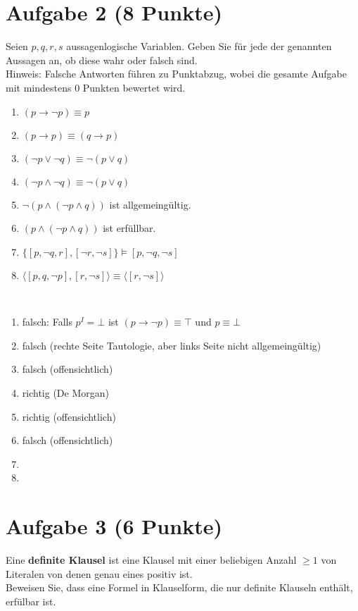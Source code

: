 \documentclass[12pt,a4paper]{article}
\begin{document}
\section*{Aufgabe 2 (8 Punkte)}
Seien $p,q,r,s$ aussagenlogische Variablen. Geben Sie für jede der genannten Aussagen an, ob diese wahr oder falsch sind.\\

Hinweis: Falsche Antworten führen zu Punktabzug, wobei die gesamte Aufgabe mit mindestens 0 Punkten bewertet wird.

\begin{enumerate}[label=\alph*)]
\item $(p\to\neg p)\equiv p$
\item $(p\to p)\equiv(q\to p)$
\item $(\neg p\vee\neg q)\equiv \neg(p\vee q)$
\item $(\neg p\wedge\neg q)\equiv \neg(p\vee q)$
\item $\neg(p\wedge(\neg p\wedge q))$ ist allgemeingültig.
\item $(p\wedge(\neg p\wedge q))$ ist erfüllbar.
\item $\big\lbrace[p,\neg q,r],[\neg r,\neg s]\big\rbrace\models[p,\neg q,\neg s]$
\item $\big\langle[p,q,\neg p],[r,\neg s]\big\rangle\equiv\big\langle[r,\neg s]\big\rangle$
\end{enumerate}
\begin{lösung}\
\begin{enumerate}[label=\alph*)]
\item falsch: Falls $p^I=\bot$ ist $(p\to\neg p)\equiv\top$ und $p\equiv\bot$
\item falsch (rechte Seite Tautologie, aber links Seite nicht allgemeingültig)
\item falsch (offensichtlich)
\item richtig (De Morgan)
\item richtig (offensichtlich)
\item falsch (offensichtlich)
\item
\item
\end{enumerate}
\end{lösung}

\section*{Aufgabe 3 (6 Punkte)}
Eine \textbf{definite Klausel} ist eine Klausel mit einer beliebigen Anzahl $\geq1$ von Literalen von denen genau eines positiv ist.\\
Beweisen Sie, dass eine Formel in Klauselform, die nur definite Klauseln enthält, erfülbar ist.
\end{document}
